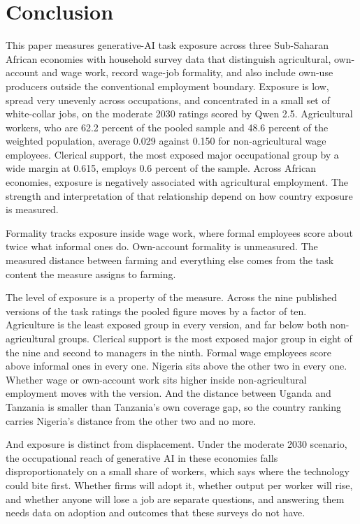 \section{Conclusion}

This paper measures generative-AI task exposure across three Sub-Saharan African
economies with household survey data that distinguish agricultural,
own-account and wage work, record wage-job formality, and also include own-use
producers outside the conventional employment boundary. Exposure is low, spread very unevenly
across occupations, and concentrated in a small set of white-collar jobs, on
the moderate 2030 ratings scored by Qwen 2.5. Agricultural workers, who are
62.2 percent of the pooled sample and 48.6 percent of the weighted population,
average 0.029 against 0.150 for non-agricultural wage employees. Clerical
support, the most exposed major occupational group by a wide margin at 0.615,
employs 0.6 percent of the sample. Across African economies, exposure is
negatively associated with agricultural employment. The strength and
interpretation of that relationship depend on how country exposure is
measured.

Formality tracks exposure inside
wage work, where formal employees score about twice what informal ones do. 
Own-account formality is unmeasured. 
The measured distance between farming and everything else comes
from the task content the measure assigns to farming.

The level of exposure is a property of the measure. Across the nine published
versions of the task ratings the pooled figure moves by a factor of ten. 
Agriculture is the least exposed group
in every version, and far below both non-agricultural groups. Clerical support
is the most exposed major group in eight of the nine and second to managers in
the ninth. Formal wage employees score above informal ones in every one. Nigeria
sits above the other two in every one. Whether wage or own-account work sits 
higher inside non-agricultural employment moves with the
version. And the distance between Uganda and Tanzania is smaller than Tanzania's
own coverage gap, so the country ranking carries Nigeria's distance from the
other two and no more.

And exposure is distinct from displacement. Under the moderate 2030 scenario,
the occupational reach of generative AI in these economies falls
disproportionately on a small share of workers, which says
where the technology could bite first. Whether firms will adopt it, whether
output per worker will rise, and whether anyone will lose a job are separate
questions, and answering them needs data on adoption and outcomes that these
surveys do not have.

